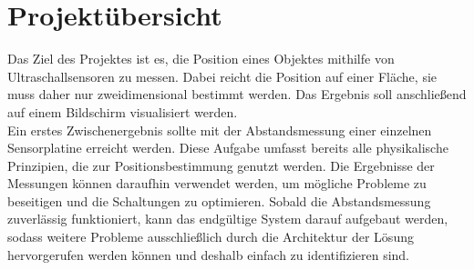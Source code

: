 


\chapter{Projektübersicht}

Das Ziel des Projektes ist es, die Position eines Objektes mithilfe von Ultraschallsensoren zu messen. Dabei reicht die Position auf einer Fläche, sie muss daher nur zweidimensional bestimmt werden. Das Ergebnis soll anschließend auf einem Bildschirm visualisiert werden.\\
Ein erstes Zwischenergebnis sollte mit der Abstandsmessung einer einzelnen Sensorplatine erreicht werden. Diese Aufgabe umfasst bereits alle physikalische Prinzipien, die zur Positionsbestimmung genutzt werden. Die Ergebnisse der Messungen können daraufhin verwendet werden, um mögliche Probleme zu beseitigen und die Schaltungen zu optimieren. Sobald die Abstandsmessung zuverlässig funktioniert, kann das endgültige System darauf aufgebaut werden, sodass weitere Probleme ausschließlich durch die Architektur der Lösung hervorgerufen werden können und deshalb einfach zu identifizieren sind.



